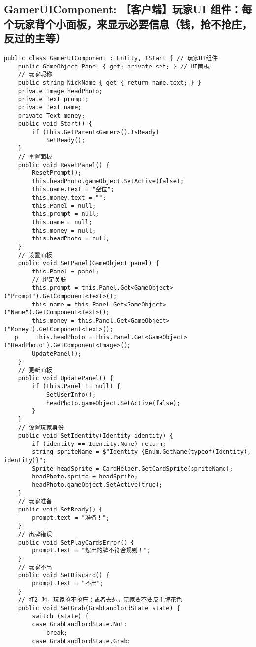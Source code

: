 \documentclass[9pt, b5paper]{article}
\begin{document}
\subsection{GamerUIComponent: 【客户端】玩家UI 组件：每个玩家背个小面板，来显示必要信息（钱，抢不抢庄，反过的主等）}
\label{sec-3-5}
\begin{verbatim}
public class GamerUIComponent : Entity, IStart { // 玩家UI组件
    public GameObject Panel { get; private set; } // UI面板
    // 玩家昵称
    public string NickName { get { return name.text; } }
    private Image headPhoto;
    private Text prompt;
    private Text name;
    private Text money;
    public void Start() {
        if (this.GetParent<Gamer>().IsReady) 
            SetReady();
    }
    // 重置面板
    public void ResetPanel() {
        ResetPrompt();
        this.headPhoto.gameObject.SetActive(false);
        this.name.text = "空位";
        this.money.text = "";
        this.Panel = null;
        this.prompt = null;
        this.name = null;
        this.money = null;
        this.headPhoto = null;
    }
    // 设置面板
    public void SetPanel(GameObject panel) {
        this.Panel = panel;
        // 绑定关联
        this.prompt = this.Panel.Get<GameObject>("Prompt").GetComponent<Text>();
        this.name = this.Panel.Get<GameObject>("Name").GetComponent<Text>();
        this.money = this.Panel.Get<GameObject>("Money").GetComponent<Text>();
   p     this.headPhoto = this.Panel.Get<GameObject>("HeadPhoto").GetComponent<Image>();
        UpdatePanel();
    }
    // 更新面板
    public void UpdatePanel() {
        if (this.Panel != null) {
            SetUserInfo();
            headPhoto.gameObject.SetActive(false);
        }
    }
    // 设置玩家身份
    public void SetIdentity(Identity identity) {
        if (identity == Identity.None) return;
        string spriteName = $"Identity_{Enum.GetName(typeof(Identity), identity)}";
        Sprite headSprite = CardHelper.GetCardSprite(spriteName);
        headPhoto.sprite = headSprite;
        headPhoto.gameObject.SetActive(true);
    }
    // 玩家准备
    public void SetReady() {
        prompt.text = "准备！";
    }
    // 出牌错误
    public void SetPlayCardsError() {
        prompt.text = "您出的牌不符合规则！";
    }
    // 玩家不出
    public void SetDiscard() {
        prompt.text = "不出";
    }
    // 打2 时，玩家抢不抢庄：或者去想，玩家要不要反主牌花色
    public void SetGrab(GrabLandlordState state) {
        switch (state) {
        case GrabLandlordState.Not:
            break;
        case GrabLandlordState.Grab:

\end{verbatim}
\end{document}
